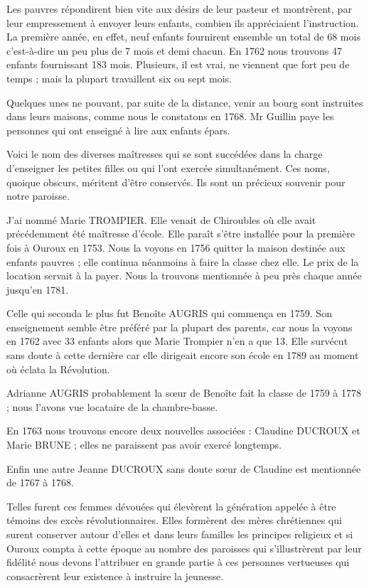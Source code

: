 Les pauvres répondirent bien vite aux désirs de leur pasteur et montrèrent, par leur empressement à envoyer leurs enfants, combien
ils appréciaient l'instruction. La première année, en effet, neuf enfants fournirent ensemble un total de 68 mois c'est-à-dire un peu plus de 7 mois et demi chacun. En 1762 nous trouvons 47 enfants fournissant 183 mois. Plusieurs, il est vrai, ne viennent que fort peu de temps ; mais la plupart travaillent six ou sept mois.

Quelques unes ne pouvant, par suite de la distance, venir au bourg sont instruites dans leurs maisons, comme nous le constatons en 1768. Mr Guillin paye les personnes qui ont enseigné à lire aux enfants épars.

Voici le nom des diverses maîtresses qui se sont succédées dans la charge d'enseigner les petites filles ou qui l'ont exercée simultanément. Ces noms, quoique obscurs, méritent d'être conservés. Ils sont un précieux souvenir pour notre paroisse.

J'ai nommé Marie TROMPIER. Elle venait de Chiroubles où elle avait précédemment été maîtresse d'école. Elle paraît s'être installée pour la première fois à Ouroux en 1753. Nous la voyons en 1756 quitter la maison destinée aux enfants pauvres ; elle continua néanmoins à faire la classe chez elle. Le prix de la location servait à la payer. Nous la trouvons mentionnée à peu près chaque année jusqu'en 1781.

Celle qui seconda le plus fut Benoîte AUGRIS qui commença en 1759. Son enseignement semble être préféré par la plupart des parents, car nous la voyons en 1762 avec 33 enfants alors que Marie Trompier n'en a que 13. Elle survécut sans doute à cette dernière car elle dirigeait encore son école en 1789 au moment où éclata la Révolution.

Adrianne AUGRIS probablement la sœur de Benoîte fait la classe de 1759 à 1778 ; nous l'avons vue locataire de la chambre-basse.

En 1763 nous trouvons encore deux nouvelles associées : Claudine DUCROUX et Marie BRUNE ; elles ne paraissent pas avoir exercé longtemps.

Enfin une autre Jeanne DUCROUX sans doute sœur de Claudine est mentionnée de 1767 à 1768.

Telles furent ces femmes dévouées qui élevèrent la génération appelée à être témoins des excès révolutionnaires. Elles formèrent
des mères chrétiennes qui surent conserver autour d'elles et dans leurs familles les principes religieux et si Ouroux compta à cette époque au nombre des paroisses qui s'illustrèrent par leur fidélité nous devons l'attribuer en grande partie à ces personnes vertueuses qui consacrèrent leur existence à instruire la jeunesse.

